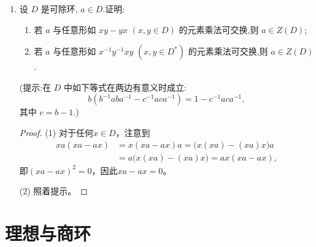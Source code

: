 \begin{enumerate}
\item 设 $D$ 是可除环, $a \in D$.证明:
\begin{enumerate}[label=(\arabic*)]
    \item 若 $a$ 与任意形如 $xy - yx$ $(x, y \in D)$ 的元素乘法可交换,则 $a \in Z(D)$;
    \item 若 $a$ 与任意形如 $x^{-1}y^{-1}xy$ $(x, y \in D^*)$ 的元素乘法可交换,则 $a \in Z(D)$.
\end{enumerate}
(提示:在 $D$ 中如下等式在两边有意义时成立:
\[
b(b^{-1}aba^{-1} - c^{-1}aca^{-1}) = 1 - c^{-1}aca^{-1},
\]
其中 $c = b - 1$.)
\begin{proof}
    (1) 对于任何$x \in D$，注意到
    \begin{align*}
        xa(xa-ax)&=x(xa-ax)a=\big(x(xa)-(xa)x\big)a\\
        &=a\big(x(xa)-(xa)x\big)=ax(xa-ax),
    \end{align*}
    即$(xa-ax)^2=0$，因此$xa-ax=0$。

    (2) 照着提示。
\end{proof}
\end{enumerate}

\section{理想与商环}

